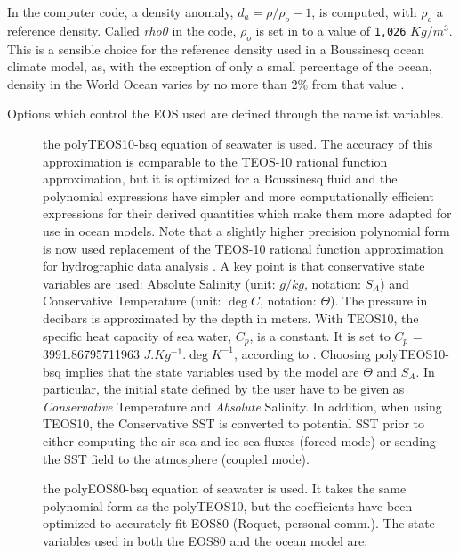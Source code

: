 \documentclass[../main/NEMO_manual]{subfiles}
\begin{document}
In the computer code, a density anomaly, $d_a = \rho / \rho_o - 1$, is computed,
with $\rho_o$ a reference density.
Called \textit{rho0} in the code,
$\rho_o$ is set in  to a value of \texttt{1,026} $Kg/m^3$.
This is a sensible choice for the reference density used in a Boussinesq ocean climate model,
as, with the exception of only a small percentage of the ocean,
density in the World Ocean varies by no more than 2\% from that value \citep{gill_bk82}.

Options which control the EOS used are defined through the  namelist variables.

\begin{description}
\item [{}] the polyTEOS10-bsq equation of seawater
  \citep{roquet.madec.ea_OM15} is used.
  The accuracy of this approximation is comparable to the TEOS-10 rational function approximation,
  but it is optimized for a Boussinesq fluid and
  the polynomial expressions have simpler and more computationally efficient expressions for
  their derived quantities which make them more adapted for use in ocean models.
  Note that a slightly higher precision polynomial form is now used
  replacement of the TEOS-10 rational function approximation for hydrographic data analysis
  \citep{ioc.iapso_bk10}.
  A key point is that conservative state variables are used:
  Absolute Salinity (unit: $g/kg$, notation: $S_A$) and
  Conservative Temperature (unit: $\deg{C}$, notation: $\Theta$).
  The pressure in decibars is approximated by the depth in meters.
  With TEOS10, the specific heat capacity of sea water, $C_p$, is a constant.
  It is set to $C_p$ = 3991.86795711963 $J.Kg^{-1}.\deg{K}^{-1}$,
  according to \citet{ioc.iapso_bk10}.
  Choosing polyTEOS10-bsq implies that the state variables used by the model are $\Theta$ and $S_A$.
  In particular, the initial state defined by the user have to be given as
  \textit{Conservative} Temperature and \textit{Absolute} Salinity.
  In addition, when using TEOS10, the Conservative SST is converted to potential SST prior to
  either computing the air-sea and ice-sea fluxes (forced mode) or
  sending the SST field to the atmosphere (coupled mode).
\item [{}] the polyEOS80-bsq equation of seawater is used.
  It takes the same polynomial form as the polyTEOS10,
  but the coefficients have been optimized to accurately fit EOS80 (Roquet, personal comm.).
  The state variables used in both the EOS80 and the ocean model are:

\end{description}
\end{document}

